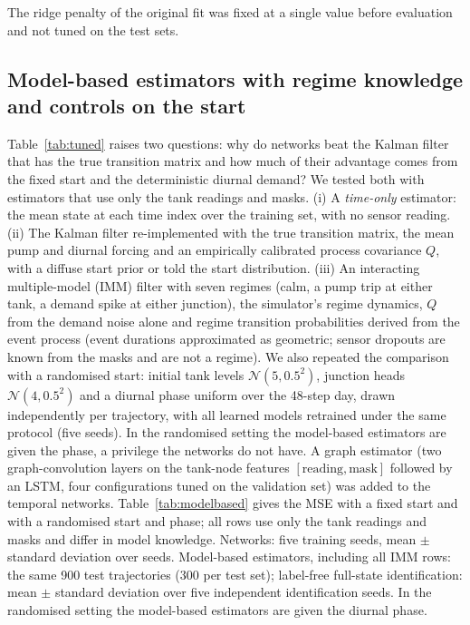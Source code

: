 \documentclass[conference]{IEEEtran}
\begin{document}
The ridge penalty of the original fit was fixed at a single value before evaluation and not tuned on the test sets.

\subsection{Model-based estimators with regime knowledge and controls on the start}
\label{sec:model_based}

Table~\ref{tab:tuned} raises two questions: why do networks beat the Kalman filter that has the true transition matrix and how much of their advantage comes from the fixed start and the deterministic diurnal demand? We tested both with estimators that use only the tank readings and masks. (i) A \emph{time-only} estimator: the mean state at each time index over the training set, with no sensor reading. (ii) The Kalman filter re-implemented with the true transition matrix, the mean pump and diurnal forcing and an empirically calibrated process covariance $Q$, with a diffuse start prior or told the start distribution. (iii) An interacting multiple-model (IMM) filter with seven regimes (calm, a pump trip at either tank, a demand spike at either junction), the simulator's regime dynamics, $Q$ from the demand noise alone and regime transition probabilities derived from the event process (event durations approximated as geometric; sensor dropouts are known from the masks and are not a regime). We also repeated the comparison with a randomised start: initial tank levels $\mathcal N(5,0.5^2)$, junction heads $\mathcal N(4,0.5^2)$ and a diurnal phase uniform over the 48-step day, drawn independently per trajectory, with all learned models retrained under the same protocol (five seeds). In the randomised setting the model-based estimators are given the phase, a privilege the networks do not have. A graph estimator (two graph-convolution layers on the tank-node features $[\text{reading},\text{mask}]$ followed by an LSTM, four configurations tuned on the validation set) was added to the temporal networks. Table~\ref{tab:modelbased} gives the MSE with a fixed start and with a randomised start and phase; all rows use only the tank readings and masks and differ in model knowledge. Networks: five training seeds, mean $\pm$ standard deviation over seeds. Model-based estimators, including all IMM rows: the same 900 test trajectories (300 per test set); label-free full-state identification: mean $\pm$ standard deviation over five independent identification seeds. In the randomised setting the model-based estimators are given the diurnal phase.
\end{document}
